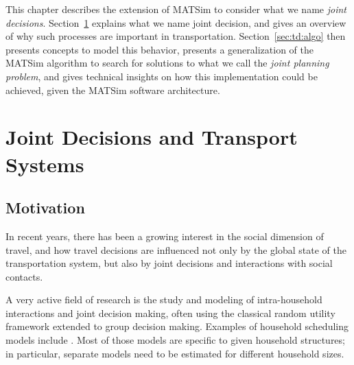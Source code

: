 { %
\newcommand\insfig[2]{%
	\insfigwidth{#1}{#2}{.8\textwidth}
}
\newcommand\insfigwidth[3]{%
\createfigure{#1}{#1}{}{%
		\texttt{[image: extending/figures/Jointtrips/\#2]}%
		}{}%
}

\newcommand\inssubfigwidth[3]{%
\createsubfigure{#2}{%
		\texttt{[image: extending/figures/Jointtrips/\#3]}%
		}{}{\quad}%
}
\newcommand\inssubfig[2]{%
\inssubfigwidth{.46\textwidth}{#1}{#2}%
}
\newcommand\insfigwithsubfigs[2]{%
\createfigure{#1}{#1}{}{%
		#2%
		}{}%
}

This chapter describes the extension of MATSim to consider what we name \emph{joint decisions}. Section~\ref{sec:td:intro} explains what we name joint decision, and gives an overview of why such processes
are important in transportation. Section~\ref{sec:td:algo} then presents concepts to model this behavior, presents a generalization of the MATSim algorithm to search for solutions to what we call the \emph{joint planning problem}, and gives technical insights on how this implementation could be achieved, given the MATSim software architecture.

\section{Joint Decisions and Transport Systems}
\label{sec:td:intro}
\subsection{Motivation}
In recent years, there has been a growing interest in the social dimension of travel, and how travel decisions are influenced not only by the global state of the transportation system, but also by joint decisions and interactions with social contacts.

A very active field of research is the study and modeling of intra-household interactions and joint decision making, often using the classical random utility framework extended to group decision making. Examples of household scheduling models include \citet{ZhangEtAl_TransResB_2005, ZhangJEtAl_TRR_2007, KatoMatsumoto_TransResB_2009, BradleyVovsha_Transportation_2005, GliebeKoppelman_Transportation_2005,
GliebeKoppelman_Transportation_2002, HoCAndMulley_Transportation_2013, VovshaGupta_Transportation_2013}. Most of those models are specific to given household structures; in particular, separate models need to be estimated for different household sizes.

}

